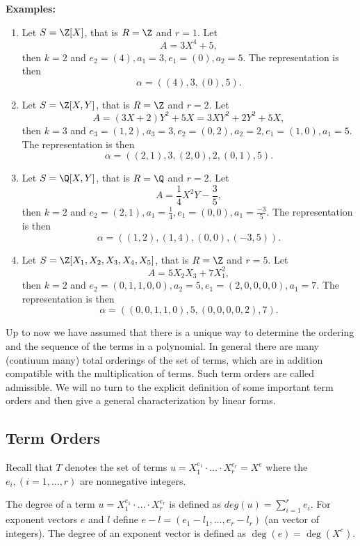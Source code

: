 {\bf Examples:}
\begin{enumerate}
\item Let $S = \Z \lbrack X \rbrack$, that is $R = \Z$ and $r = 1$.
      Let $$A = 3 X^4 + 5,$$
      then $k = 2$ and $e_2 = (4), a_1 = 3, e_1 = (0), a_2 = 5$. 
      The representation is then 
      $$ \alpha = ( ( 4 ), 3, ( 0 ), 5 ). $$
\item Let $S = \Z \lbrack X, Y \rbrack$, 
      that is $R = \Z$ and $r = 2$.
      Let $$A = ( 3 X + 2 ) Y^2 + 5 X = 3 X Y^2 + 2 Y^2 + 5 X,$$
      then $k = 3$ and $e_3 = ( 1, 2), a_3 = 3, 
           e_2 = ( 0, 2 ), a_2 = 2, e_1 = ( 1, 0 ), a_1 = 5$. 
      The representation is then 
      $$ \alpha = ( ( 2, 1 ), 3, ( 2, 0 ), 2, ( 0, 1 ), 5 ). $$
\item Let $S = \Q \lbrack X, Y \rbrack$, 
      that is $R = \Q$ and $r = 2$.
      Let $$A = \frac{1}{4} X^2 Y - \frac{3}{5},$$
      then $k = 2$ and $e_2 = ( 2, 1 ), a_1 = \frac{1}{4}, 
           e_1 = ( 0, 0 ), a_1 = \frac{-3}{5}$. 
      The representation is then 
      $$ \alpha = ( ( 1, 2 ), ( 1, 4 ), ( 0, 0 ), ( -3, 5 ) ). $$
\item Let $S = \Z \lbrack X_1, X_2, X_3, X_4, X_5 \rbrack$, 
      that is $R = \Z$ and $r = 5$.
      Let $$A = 5 X_2 X_3 + 7 X_1^2,$$
      then $k = 2$ and $e_2 = ( 0, 1, 1, 0, 0 ), a_2 = 5, 
                        e_1 = ( 2, 0, 0, 0, 0 ), a_1 = 7$. 
      The representation is then 
      $$ \alpha = ( ( 0, 0, 1, 1, 0 ), 5, 
                    ( 0, 0, 0, 0, 2 ), 7 ). $$
\end{enumerate}

Up to now we have assumed that there is 
a unique way to determine the ordering and 
the sequence of the terms in a polynomial. 
In general there are many (contiuum many) 
total orderings of the set of terms, which are in addition 
compatible with the multiplication of terms.
Such term orders are called admissible.  
We will no turn to the explicit definition of 
some important term orders and then 
give a general characterization by linear forms.  


\subsection{Term Orders} %

Recall that $T$ denotes the set of terms 
$u = X_1^{e_1} \cdot \ldots \cdot X_r^{e_r} = X^e$
where the $e_i, (i=1,\ldots,r) $ are nonnegative integers.

The degree of a term 
$ u = X_1^{e_1} \cdot \ldots \cdot X_r^{e_r} $
is defined as
$ deg(u) = \sum_{i=1}^{r} e_i.$
For exponent vectors $e$ and $l$ define 
$ e - l = (e_1 - l_1, \ldots, e_r - l_r) $
(an vector of integers).
The degree of an exponent vector
is defined as
$ \deg (e) = \deg( X^{e} ). $

